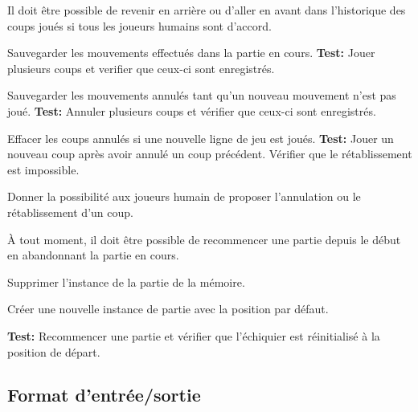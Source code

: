 \documentclass{article}
\begin{document}
\begin{needbox}
    Il doit être possible de revenir en arrière ou d'aller en avant dans l'historique des coups joués si tous les joueurs humains sont d'accord.
    \begin{subneedbox}
        Sauvegarder les mouvements effectués dans la partie en cours.
        \textbf{Test:} Jouer plusieurs coups et verifier que ceux-ci sont enregistrés.
    \end{subneedbox}
    \begin{subneedbox}
        Sauvegarder les mouvements annulés tant qu'un nouveau mouvement n'est pas joué.
        \textbf{Test:} Annuler plusieurs coups et vérifier que ceux-ci sont enregistrés.
    \end{subneedbox}
    \begin{subneedbox}
        Effacer les coups annulés si une nouvelle ligne de jeu est joués.
        \textbf{Test:} Jouer un nouveau coup après avoir annulé un coup précédent. Vérifier que le rétablissement est impossible.
    \end{subneedbox}
    \begin{subneedbox}
        Donner la possibilité aux joueurs humain de proposer l'annulation ou le rétablissement d'un coup.
    \end{subneedbox}
\end{needbox}

\begin{needbox}
    À tout moment, il doit être possible de recommencer une partie depuis le début en abandonnant la partie en cours.
    \begin{subneedbox}
        Supprimer l'instance de la partie de la mémoire.
    \end{subneedbox}
    \begin{subneedbox}
        Créer une nouvelle instance de partie avec la position par défaut.
    \end{subneedbox}
    \textbf{Test:} Recommencer une partie et vérifier que l'échiquier est réinitialisé à la position de départ.
\end{needbox}

\subsection{Format d'entrée/sortie}
\end{document}
